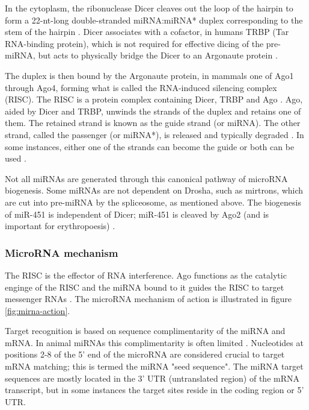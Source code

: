 In the cytoplasm, the ribonuclease Dicer cleaves out the loop of the hairpin
to form a 22-nt-long double-stranded miRNA:miRNA* duplex corresponding to
the stem of the hairpin \citep{Bernstein2001}.
Dicer associates with a cofactor, in humans TRBP (Tar RNA-binding protein),
which is not required for effective dicing of the pre-miRNA,
but acts to physically bridge the Dicer to an Argonaute protein
\citep{Chendrimada2005}.

The duplex is then bound by the Argonaute protein, in mammals one of Ago1
through Ago4, forming what is called the RNA-induced silencing complex (RISC).
The RISC is a protein complex containing Dicer, TRBP and Ago \citep{Gregory2005}.
Ago, aided by Dicer and TRBP, unwinds the strands of the duplex and retains one of
them. The retained strand is known as the guide strand (or miRNA). The other
strand, called the passenger (or miRNA*), is released and typically degraded \citep{Du2005}.
In some instances, either one of the strands can become the guide
or both can be used \citep{Czech2009}.

Not all miRNAs are generated through this canonical pathway of microRNA
biogenesis. Some miRNAs are not dependent on Drosha, such as mirtrons, which
are cut into pre-miRNA by the spliceosome, as mentioned above. The biogenesis of
miR-451 is independent of Dicer; miR-451 is cleaved by Ago2 (and is
important for erythropoesis) \citep{Cheloufi2010}.






\subsubsection{MicroRNA mechanism}\label{microrna-mechanism}

The RISC is the effector of RNA interference. Ago functions as the catalytic
enginge of the RISC and the miRNA bound to it guides the RISC to target
messenger RNAs \citep{Filipowicz2008}. The microRNA mechanism of action is
illustrated in figure \ref{fig:mirna-action}.

Target recognition is based on sequence complimentarity of the miRNA and mRNA.
In animal miRNAs this complimentarity is often limited \citep{Ambros2004}.
Nucleotides at positions 2-8 of the 5' end of the microRNA are considered
crucial to target mRNA matching; this is termed the miRNA "seed sequence". The
miRNA target sequences are mostly located in the 3' UTR (untranslated region)
of the mRNA transcript, but in some instances the target sites reside in the
coding region or 5' UTR. \citep{Bartel2009}

